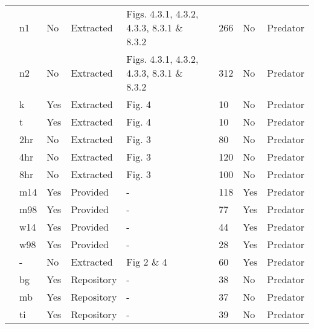 \begin{longtable}{lllllllll}
\citet{Uttley:1980aa}&n1&No&Extracted&Figs. 4.3.1, 4.3.2, 4.3.3, 8.3.1 \& 8.3.2&\citet{Novak:2020aa}&266&No&Predator\tabularnewline
\citet{Uttley:1980aa}&n2&No&Extracted&Figs. 4.3.1, 4.3.2, 4.3.3, 8.3.1 \& 8.3.2&\citet{Novak:2020aa}&312&No&Predator\tabularnewline
\citet{Vahl:2005aa}&k&Yes&Extracted&Fig. 4&\citet{Novak:2020aa}&10&No&Predator\tabularnewline
\citet{Vahl:2005aa}&t&Yes&Extracted&Fig. 4&\citet{Novak:2020aa}&10&No&Predator\tabularnewline
\citet{Von-Westernhagen:1976aa}&2hr&No&Extracted&Fig. 3&\citet{Novak:2020aa}&80&No&Predator\tabularnewline
\citet{Von-Westernhagen:1976aa}&4hr&No&Extracted&Fig. 3&\citet{Novak:2020aa}&120&No&Predator\tabularnewline
\citet{Von-Westernhagen:1976aa}&8hr&No&Extracted&Fig. 3&\citet{Novak:2020aa}&100&No&Predator\tabularnewline
\citet{Vucetich:2002aa}&m14&Yes&Provided&-&\citet{Vucetich:2002aa, Jost:2005aa}&118&Yes&Predator\tabularnewline
\citet{Vucetich:2002aa}&m98&Yes&Provided&-&\citet{Vucetich:2002aa, Jost:2005aa}&77&Yes&Predator\tabularnewline
\citet{Vucetich:2002aa}&w14&Yes&Provided&-&\citet{Vucetich:2002aa, Jost:2005aa}&44&Yes&Predator\tabularnewline
\citet{Vucetich:2002aa}&w98&Yes&Provided&-&\citet{Vucetich:2002aa, Jost:2005aa}&28&Yes&Predator\tabularnewline
\citet{Walde:1984aa}&-&No&Extracted&Fig 2 \& 4&\citet{Novak:2020aa}&60&Yes&Predator\tabularnewline
\citet{Wasserman:2016aa}&bg&Yes&Repository&-&\citet{Wasserman:2016ab}&38&No&Predator\tabularnewline
\citet{Wasserman:2016aa}&mb&Yes&Repository&-&\citet{Wasserman:2016ab}&37&No&Predator\tabularnewline
\citet{Wasserman:2016aa}&ti&Yes&Repository&-&\citet{Wasserman:2016ab}&39&No&Predator\tabularnewline
\hline
\end{longtable}

